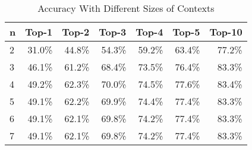\begin{table}[t]
  \centering
  \caption{Accuracy With Different Sizes of Contexts}
    \begin{tabular}{l|r|r|r|r|r|r}
    \hline
     n     & Top-1 & Top-2 & Top-3 & Top-4 & Top-5 & Top-10\\
    \hline
    2 & 31.0\% & 44.8\% & 54.3\% & 59.2\% & 63.4\% & 77.2\% \\
    3 & 46.1\% & 61.2\% & 68.4\% & 73.5\% & 76.4\% & 83.3\% \\
    4 & 49.2\% & 62.3\% & 70.0\% & 74.5\% & 77.6\% & 83.4\% \\
    5 & 49.1\% & 62.2\% & 69.9\% & 74.4\% & 77.4\% & 83.3\% \\
    6 & 49.1\% & 62.1\% & 69.8\% & 74.2\% & 77.4\% & 83.3\% \\
    7 & 49.1\% & 62.1\% & 69.8\% & 74.2\% & 77.4\% & 83.3\% \\
    \hline
     \end{tabular}%
  \label{nsizeaccuracy}%
\end{table}%

